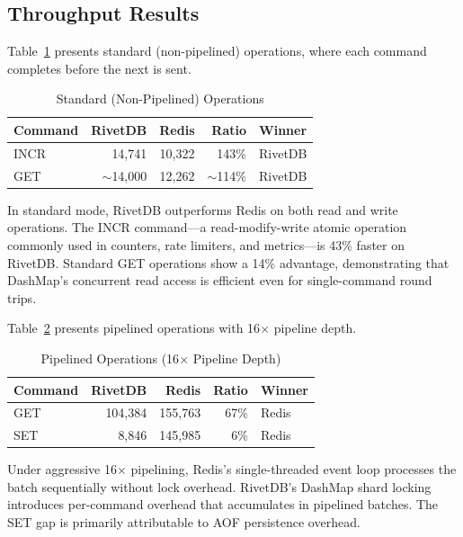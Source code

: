 \documentclass[conference,a4paper]{IEEEtran}
\begin{document}
\subsection{Throughput Results}

Table~\ref{tab:standard} presents standard (non-pipelined) operations, where each command completes before the next is sent.

\begin{table}[htbp]
\caption{Standard (Non-Pipelined) Operations}
\label{tab:standard}
\centering
\begin{tabular}{@{}lrrrl@{}}
\toprule
\textbf{Command} & \textbf{RivetDB} & \textbf{Redis} & \textbf{Ratio} & \textbf{Winner} \\
\midrule
INCR & 14,741 & 10,322 & 143\% & RivetDB \\
GET & $\sim$14,000 & 12,262 & $\sim$114\% & RivetDB \\
\bottomrule
\end{tabular}
\end{table}

In standard mode, RivetDB outperforms Redis on both read and write operations. The INCR command---a read-modify-write atomic operation commonly used in counters, rate limiters, and metrics---is 43\% faster on RivetDB. Standard GET operations show a 14\% advantage, demonstrating that DashMap's concurrent read access is efficient even for single-command round trips.

Table~\ref{tab:pipelined} presents pipelined operations with 16$\times$ pipeline depth.

\begin{table}[htbp]
\caption{Pipelined Operations (16$\times$ Pipeline Depth)}
\label{tab:pipelined}
\centering
\begin{tabular}{@{}lrrrl@{}}
\toprule
\textbf{Command} & \textbf{RivetDB} & \textbf{Redis} & \textbf{Ratio} & \textbf{Winner} \\
\midrule
GET & 104,384 & 155,763 & 67\% & Redis \\
SET & 8,846 & 145,985 & 6\% & Redis \\
\bottomrule
\end{tabular}
\end{table}

Under aggressive 16$\times$ pipelining, Redis's single-threaded event loop processes the batch sequentially without lock overhead. RivetDB's DashMap shard locking introduces per-command overhead that accumulates in pipelined batches. The SET gap is primarily attributable to AOF persistence overhead.
\end{document}
